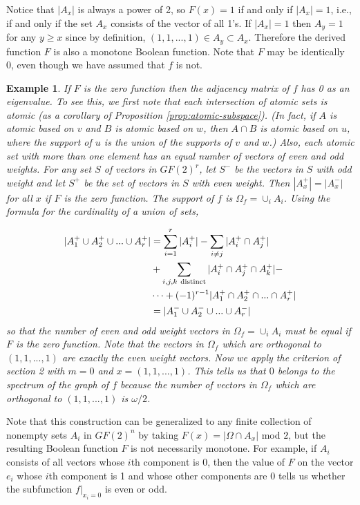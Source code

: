 \documentclass[12pt]{article}
\newtheorem{example}[theorem]{Example}
\begin{document}
Notice that $|A_x|$ is always a power of 2, so $F(x)=1$ if and only if $|A_x|=1$, i.e., if and only if the set $A_x$ consists of the vector
of all 1's.  If $|A_x|=1$ then $A_y=1$ for any $y \geq x$ since by
definition, $(1,1,...,1) \in A_y \subset A_x$.
Therefore the derived function $F$ is also a monotone Boolean function.  Note that $F$ may be identically 0, even though we have assumed that $f$ is not.

\begin{example}
If $F$ is the zero function then the adjacency matrix of $f$ has 0 as an eigenvalue.  To see this,
we first note that each intersection of atomic sets is atomic (as a
corollary of Proposition \ref{prop:atomic-subspace}).
(In fact, if $A$ is atomic based on $v$ and $B$ is atomic based on
$w$, then $A \cap B$ is atomic
based on $u$, where the support of $u$ is the union of the supports of
$v$ and $w$.)  Also, each atomic
set with more than one element has an equal number of vectors of even
and odd weights.
For any set $S$ of vectors in $GF(2)^r$, let
$S^-$ be the vectors in $S$ with odd weight and let $S^+$ be the set of vectors in $S$ with even weight.  Then $|A_x^+|=|A_x^-|$ for
all $x$ if $F$ is the zero function.  The support of $f$ is
$\Omega_f=\cup_i A_i$.  Using the formula for the cardinality of a
union of sets,

\begin{align*}
|A_1^+ \cup A_2^+ \cup ... \cup A_r^+|
&=\sum_{i=1}^r |A_i^+| - \sum_{i\neq j} |A_i^+ \cap A_j^+| \\
&+ \sum_{i,j,k\ {\rm distinct}} |A_i^+ \cap A_j^+ \cap A_k^+| -  \\
& \dots +(-1)^{r-1} |A_1^+ \cap A_2^+ \cap ... \cap A_r^+|\\
&=|A_1^- \cup A_2^- \cup ... \cup A_r^-|
\end{align*}
so that the number of even and odd weight vectors in $\Omega_f=\cup_i A_i$ must be equal if $F$ is the zero function.
Note that the vectors in $\Omega_f$ which are orthogonal to $(1,1,...,1)$ are exactly the even weight vectors.
Now we apply the criterion of section 2 with $m=0$ and $x=(1,1,...,1)$.   This tells us that $0$ belongs to the spectrum
of the graph of $f$ because the number of vectors in $\Omega_f$ which are orthogonal to $(1,1,...,1)$ is $\omega/2$.

\end{example}

Note that this construction can be generalized to any finite
collection of nonempty
sets $A_i$ in $GF(2)^n$ by taking $F(x)=|\Omega \cap A_x|$ mod $2$,
but the resulting
Boolean function $F$ is not necessarily monotone.  For example, if
$A_i$ consists
of all vectors whose $i$th component is $0$, then the value of $F$ on
the vector $e_i$
whose $i$th component is 1 and whose other components are 0 tells us whether the subfunction $f|_{x_i=0}$ is even or odd.
\end{document}

